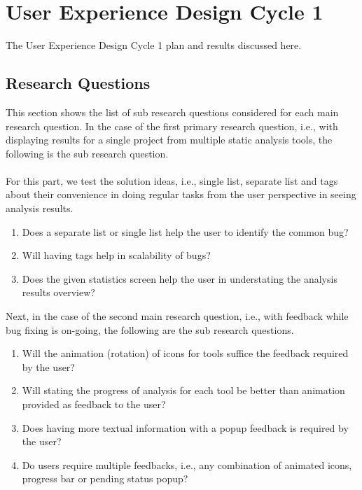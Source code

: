 \chapter{User Experience Design Cycle 1}
\label{ch:ux1-cycle_report}

The User Experience Design Cycle 1 plan and results discussed here.

\section{Research Questions}

This section shows the list of sub research questions considered for each main research question. In the case of the first primary research question, i.e., with displaying results for a single project from multiple static analysis tools, the following is the sub research question. \\ \\

For this part, we test the solution ideas, i.e., single list, separate list and tags about their convenience in doing regular tasks from the user perspective in seeing analysis results. \\

\begin{enumerate}
\item Does a separate list or single list help the user to identify the common bug?
\item Will having tags help in scalability of bugs?
\item Does the given statistics screen help the user in understating the analysis results overview? 
\end{enumerate}

Next, in the case of the second main research question, i.e., with feedback while bug fixing is on-going, the following are the sub research questions. \\

\begin{enumerate}
\item Will the animation (rotation) of icons for tools suffice the feedback required by the user?
\item Will stating the progress of analysis for each tool be better than animation provided as feedback to the user?
\item Does having more textual information with a popup feedback is required by the user?
\item Do users require multiple feedbacks, i.e., any combination of animated icons, progress bar or pending status popup?
\end{enumerate}

